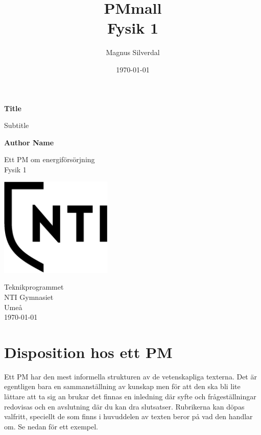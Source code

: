 \documentclass[11p]{article}
\title{PMmall \\ \small Fysik 1}
\author{Magnus Silverdal }
\date{\today}
\begin{document}
    \begin{titlepage}
        \begin{center}
            \vspace*{1cm}

            \Huge
            \textbf{Title}

            \vspace{0.5cm}
            \LARGE
            Subtitle

            \vspace{1.5cm}

            \textbf{Author Name}

            \vfill

            Ett PM om energiförsörjning \\
            Fysik 1

            \vspace{0.8cm}

            \includegraphics[width=0.4\textwidth]{NTI Gymnasiet_Symbol_print_svart.png}

            \Large
            Teknikprogrammet\\
            NTI Gymnasiet\\
            Umeå\\
            \today

        \end{center}
    \end{titlepage}
    \tableofcontents
    \newpage
    \section{Disposition hos ett PM}
    Ett PM har den mest informella strukturen av de vetenskapliga texterna. Det är egentligen bara en sammanställning av kunskap men för att den ska bli lite lättare att ta sig an brukar det finnas en inledning där syfte och frågeställningar redovisas och en avslutning där du kan dra slutsatser. Rubrikerna kan döpas valfritt, speciellt de som finns i huvuddelen av texten beror på vad den handlar om. Se nedan för ett exempel.
\end{document}
